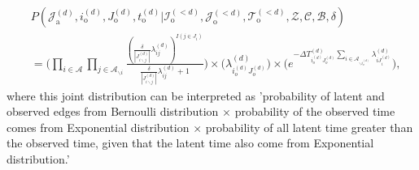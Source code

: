 \documentclass[a4paper]{article}
\begin{document}
\begin{equation}
\begin{aligned}
&P(\mathcal{J}^{(d)}_{\mbox{a}}, i^{(d)}_{\mbox{o}}, J^{(d)}_{\mbox{o}}, t^{(d)}_{\mbox{o}} |\mathcal{I}^{(<d)}_{\mbox{o}}, \mathcal{J}^{(<d)}_{\mbox{o}}, \mathcal{T}^{(<d)}_{\mbox{o}}, \mathcal{Z}, \mathcal{C}, \mathcal{B}, \delta)\\&=\Big(\prod_{i\in \mathcal{A}}\prod_{j\in \mathcal{A}_{\backslash i}} \frac{(\frac{\delta}{|J^{(d)}_{i \backslash j}|}\lambda^{(d)}_{ij})^{I(j \in J_i)}}{\frac{\delta}{|J^{(d)}_{i \backslash j}|}\lambda^{(d)}_{ij}+1}\Big)\times \Big(\lambda^{(d)}_{i_o^{(d)}J_{o}^{(d)}}\Big)\times  \Big(e^{-\Delta T^{(d)}_{i_o^{(d)}J_o^{(d)}}\sum\limits_{i\in \mathcal{A}_{\backslash i_o^{(d)}}}\lambda^{(d)}_{iJ^{(d)}_{i}}}\Big),
\end{aligned}
\end{equation}
where this joint distribution can be interpreted as 'probability of latent and observed edges from Bernoulli distribution $\times$ probability of the observed time comes from Exponential distribution $\times$ probability of all latent time greater than the observed time, given that the latent time also come from Exponential distribution.'
\end{document}
